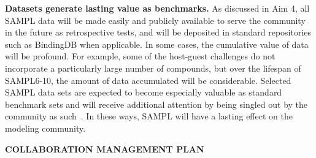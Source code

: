 \documentclass[11pt]{article}
\begin{document}
\textbf{Datasets generate lasting value as benchmarks.}
As discussed in Aim 4, all SAMPL data will be made easily and publicly available to serve the community in the future as retrospective tests, and will be deposited in standard repositories such as BindingDB when applicable.
In some cases, the cumulative value of data will be profound. 
For example, some of the host-guest challenges do not incorporate a particularly large number of compounds, but over the lifespan of SAMPL6-10, the amount of data accumulated will be considerable.
Selected SAMPL data sets are expected to become especially valuable as standard benchmark sets and will receive additional attention by being singled out by the community as such~\cite{mobley_predicting_2016}.
In these ways, SAMPL will have a lasting effect on the modeling community.




{\large \bf COLLABORATION MANAGEMENT PLAN} %
\end{document}
